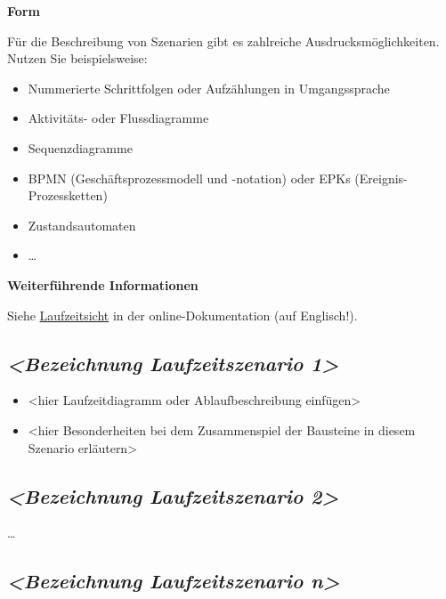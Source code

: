 \documentclass[a4paper,12pt]{article}
\begin{document}
\textbf{Form}

Für die Beschreibung von Szenarien gibt es zahlreiche
Ausdrucksmöglichkeiten. Nutzen Sie beispielsweise:

\begin{itemize}
\item
  Nummerierte Schrittfolgen oder Aufzählungen in Umgangssprache
\item
  Aktivitäts- oder Flussdiagramme
\item
  Sequenzdiagramme
\item
  BPMN (Geschäftsprozessmodell und -notation) oder EPKs
  (Ereignis-Prozessketten)
\item
  Zustandsautomaten
\item
  \ldots\hspace{0pt}
\end{itemize}

\textbf{Weiterführende Informationen}

Siehe \href{https://docs.arc42.org/section-6/}{Laufzeitsicht} in der
online-Dokumentation (auf Englisch!).

\subsection{\texorpdfstring{\emph{\textless Bezeichnung Laufzeitszenario
1\textgreater{}}}{\textless Bezeichnung Laufzeitszenario 1\textgreater{}}}\label{_bezeichnung_laufzeitszenario_1}

\begin{itemize}
\item
  \textless hier Laufzeitdiagramm oder Ablaufbeschreibung
  einfügen\textgreater{}
\item
  \textless hier Besonderheiten bei dem Zusammenspiel der Bausteine in
  diesem Szenario erläutern\textgreater{}
\end{itemize}

\subsection{\texorpdfstring{\emph{\textless Bezeichnung Laufzeitszenario
2\textgreater{}}}{\textless Bezeichnung Laufzeitszenario 2\textgreater{}}}\label{_bezeichnung_laufzeitszenario_2}

\ldots\hspace{0pt}

\subsection{\texorpdfstring{\emph{\textless Bezeichnung Laufzeitszenario
n\textgreater{}}}{\textless Bezeichnung Laufzeitszenario n\textgreater{}}}\label{_bezeichnung_laufzeitszenario_n}
\end{document}
